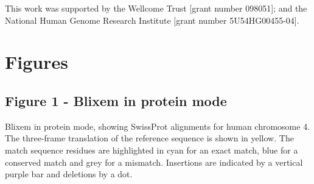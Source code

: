 \documentclass[10pt]{bmc_article}
\newenvironment{bmcformat}{\begin{raggedright}\baselineskip20pt\sloppy\setboolean{publ}{false}}{\end{raggedright}\baselineskip20pt\sloppy}
\begin{document}
\begin{bmcformat}
This work was supported by the Wellcome Trust [grant number 098051]; and the National Human Genome Research Institute [grant number 5U54HG00455-04].

 


{
   }     %





\section*{Figures}
\subsection*{Figure 1 - Blixem in protein mode}
Blixem in protein mode, showing SwissProt alignments for human chromosome 4. The three-frame translation of the reference sequence is shown in yellow. The match sequence residues are highlighted in cyan for an exact match, blue for a conserved match and grey for a mismatch. Insertions are indicated by a vertical purple bar and deletions by a dot.


\end{bmcformat}
\end{document}
